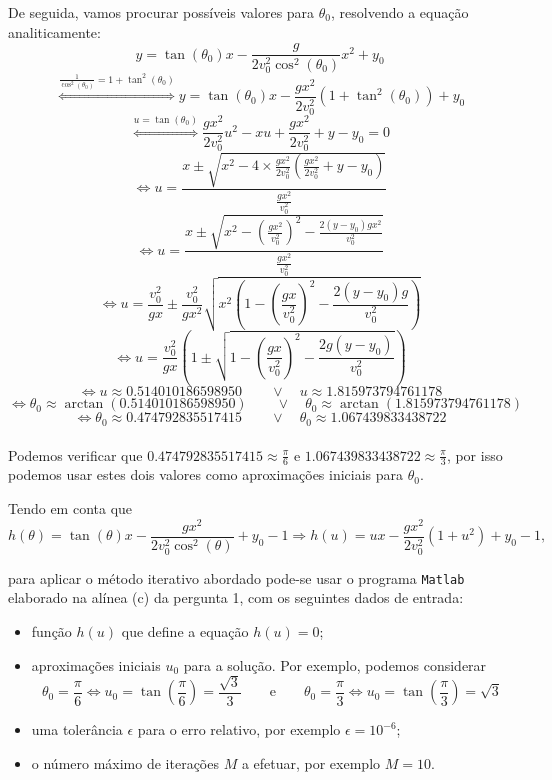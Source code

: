\documentclass[12pt,a4paper]{article}
\begin{document}
\noindent De seguida, vamos procurar possíveis valores para $\theta_0$, resolvendo a equação analiticamente:
\[
    y=\tan(\theta_0)x - \frac{g}{2v_0^2\cos^2(\theta_0)}x^2+y_0 
\]\[
    \overset{\frac{1}{\cos^2(\theta_0)}=1+\tan^2(\theta_0)}{\Leftrightarrow}     y=\tan(\theta_0)x - \frac{gx^2}{2v_0^2}(1+\tan^2(\theta_0))+y_0 
\]\[
    \overset{u=\tan(\theta_0)}{\Leftrightarrow} \frac{gx^2}{2v_0^2}u^2-xu+\frac{gx^2}{2v_0^2}+y-y_0 =0
\]\[
    \Leftrightarrow u=\frac{x\pm\sqrt{x^2-4\times\frac{gx^2}{2v_0^2}\left(\frac{gx^2}{2v_0^2}+y-y_0\right)}}{\frac{gx^2}{v_0^2}}
\]\[
    \Leftrightarrow u=\frac{x\pm\sqrt{x^2-{\left(\frac{gx^2}{v_0^2}\right)}^2-\frac{2(y-y_0)gx^2}{v_0^2}}}{\frac{gx^2}{v_0^2}}
\]\[
    \Leftrightarrow u=\frac{v_0^2}{gx} \pm \frac{v_0^2}{gx^2}\sqrt{x^2\left(1-\left(\frac{gx}{v_0^2}\right)^2-\frac{2(y-y_0)g}{v_0^2}\right)}
\]\[
    \Leftrightarrow u=\frac{v_0^2}{gx}\left(1 \pm \sqrt{1-\left(\frac{gx}{v_0^2}\right)^2-\frac{2g(y-y_0)}{v_0^2}}\right)
\]%
\[
    \Leftrightarrow u\approx 0.514010186598950 \qquad \vee \quad u\approx 1.815973794761178
\]
\[
    \Leftrightarrow \theta_0\approx \arctan(0.514010186598950) \qquad \vee \quad \theta_0\approx \arctan(1.815973794761178)
\]
\[
    \Leftrightarrow \theta_0\approx 0.474792835517415 \qquad \vee \quad \theta_0\approx 1.067439833438722
\]
\\
Podemos verificar que $0.474792835517415\approx\frac{\pi}{6}$ e $1.067439833438722\approx\frac{\pi}{3}$, por isso podemos usar estes dois valores como aproximações iniciais para $\theta_0$.

\noindent Tendo em conta que 
\[
    h(\theta)=\tan(\theta)x - \frac{gx^2}{2v_0^2\cos^2(\theta)}+y_0-1 \Rightarrow h(u)=ux-\frac{gx^2}{2v_0^2}(1+u^2) + y_0-1  \text{,}
\]


\noindent para aplicar o método iterativo abordado pode-se usar o programa \texttt{Matlab} elaborado na alínea (c) da pergunta 1, com os seguintes dados de entrada:
\begin{itemize}
    \item função $h(u)$ que define a equação $h(u)=0$;
    \item aproximações iniciais $u_0$ para a solução. Por exemplo, podemos considerar \[\theta_0=\frac{\pi}{6}\Leftrightarrow u_0=\tan\left(\frac{\pi}{6}\right)=\frac{\sqrt{3}}{3} \qquad \text{e} \qquad \theta_0=\frac{\pi}{3}\Leftrightarrow u_0=\tan\left(\frac{\pi}{3}\right)=\sqrt{3}\]
    \item uma tolerância $\epsilon$ para o erro relativo, por exemplo $\epsilon=10^{-6}$;
    \item o número máximo de iterações $M$ a efetuar, por exemplo $M=10$.
\end{itemize}
\end{document}
